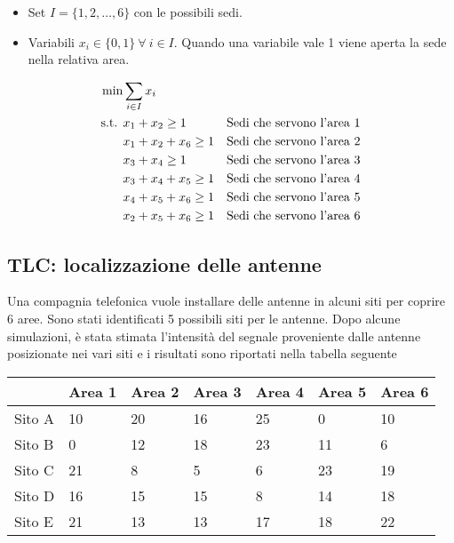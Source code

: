 \begin{itemize}
	\item Set $I = \{1,2, \ldots , 6 \}$ con le possibili sedi.
	\item Variabili $x_i \in \{0,1\} \: \forall\: i \in I$. Quando una variabile vale 1 viene aperta la sede nella relativa area.
\end{itemize}

\begin{align*}
\min &\sum\limits_{i \in I} x_i \\ 
\text{s.t. } &x_1 + x_2 \geq 1 &\text{Sedi che servono l'area 1} \\
	&x_1 + x_2 + x_6 \geq 1 &\text{Sedi che servono l'area 2} \\
	&x_3 + x_4 \geq 1 &\text{Sedi che servono l'area 3} \\
	&x_3 + x_4 + x_5 \geq 1 &\text{Sedi che servono l'area 4} \\
	&x_4 + x_5+x_6 \geq 1 &\text{Sedi che servono l'area 5} \\
	&x_2 + x_5 + x_6 \geq 1 &\text{Sedi che servono l'area 6} \\
\end{align*}

\subsection{TLC: localizzazione delle antenne}

Una compagnia telefonica vuole installare delle antenne in alcuni siti per coprire 6 aree. Sono stati identificati 5 possibili siti per le antenne. Dopo alcune simulazioni, è stata stimata l'intensità del segnale proveniente dalle antenne posizionate nei vari siti e i risultati sono riportati nella tabella seguente

\begin{table}[htbp]
	\centering
	\begin{tabular}{|l|l|l|l|l|l|l|}
		\hline
		& Area 1 & Area 2 & Area 3 & Area 4 & Area 5 & Area 6 \\ \hline
		Sito A & 10 & 20 & 16 & 25 & 0 & 10 \\ \hline
		Sito B & 0 & 12 & 18 & 23 & 11 & 6 \\ \hline
		Sito C & 21 & 8 & 5 & 6 & 23 & 19 \\ \hline
		Sito D & 16 & 15 & 15 & 8 & 14 & 18 \\ \hline
		Sito E & 21 & 13 & 13 & 17 & 18 & 22 \\ \hline
	\end{tabular}
\end{table}

